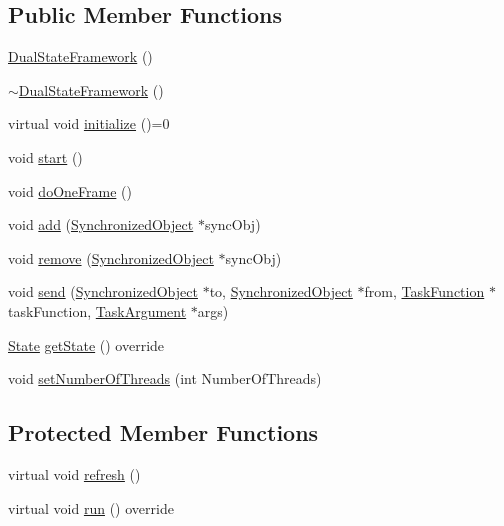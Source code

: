 \subsection*{Public Member Functions}
\begin{DoxyCompactItemize}
\item 
\hyperlink{classdsf_1_1_dual_state_framework_ab2c3f064dee1876d92694544d032b942}{Dual\+State\+Framework} ()
\item 
\hyperlink{classdsf_1_1_dual_state_framework_a0e5246056c73a684d0a167f3ed6d1fb1}{$\sim$\+Dual\+State\+Framework} ()
\item 
virtual void \hyperlink{classdsf_1_1_dual_state_framework_a809a7bba4148e17ea9a43a0a035383ba}{initialize} ()=0
\item 
void \hyperlink{classdsf_1_1_dual_state_framework_ab17692c652ab856818d5e8f0dd82f194}{start} ()
\item 
void \hyperlink{classdsf_1_1_dual_state_framework_a72f0e6753a30394c0e505bb0bc481e3f}{do\+One\+Frame} ()
\item 
void \hyperlink{classdsf_1_1_dual_state_framework_a2ce40c8e165a8ed8fd6cb6cb30ae985b}{add} (\hyperlink{classdsf_1_1_synchronized_object}{Synchronized\+Object} $\ast$sync\+Obj)
\item 
void \hyperlink{classdsf_1_1_dual_state_framework_ab6ca84c5186f4fc3e048c4ff7a104ae7}{remove} (\hyperlink{classdsf_1_1_synchronized_object}{Synchronized\+Object} $\ast$sync\+Obj)
\item 
void \hyperlink{classdsf_1_1_dual_state_framework_a3063d7f0ce537eb44dc2bdcec816a36b}{send} (\hyperlink{classdsf_1_1_synchronized_object}{Synchronized\+Object} $\ast$to, \hyperlink{classdsf_1_1_synchronized_object}{Synchronized\+Object} $\ast$from, \hyperlink{namespacedsf_aa16e735f29587f4485b56fc46746f7a9}{Task\+Function} $\ast$task\+Function, \hyperlink{namespacedsf_abe4bf68433935a81c31a5ada9b17663a}{Task\+Argument} $\ast$args)
\item 
\hyperlink{classdsf_1_1_runnable_a8eb63b21a0accc7a6a2a05f18e257991}{State} \hyperlink{classdsf_1_1_dual_state_framework_aca55fd7ccccf9637aa4cd626cd2bbe58}{get\+State} () override
\item 
void \hyperlink{classdsf_1_1_dual_state_framework_a8ab358a7456eeed264d53304b6562be4}{set\+Number\+Of\+Threads} (int Number\+Of\+Threads)
\end{DoxyCompactItemize}
\subsection*{Protected Member Functions}
\begin{DoxyCompactItemize}
\item 
virtual void \hyperlink{classdsf_1_1_dual_state_framework_afe53c4d52bfb56b0b73c6b9fd397b007}{refresh} ()
\item 
virtual void \hyperlink{classdsf_1_1_dual_state_framework_a25b6b35182320df2cf02a8505b1ff83b}{run} () override
\end{DoxyCompactItemize}
